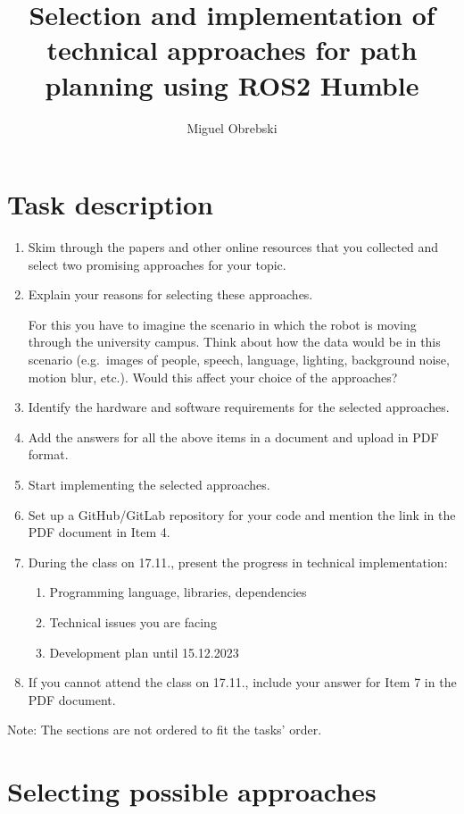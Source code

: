\documentclass[11pt,a4paper]{article}
\title{Selection and implementation of technical approaches for path planning using ROS2 Humble}
\author{Miguel Obrebski}
\date{} %
\begin{document}
\maketitle


\section{Task description}
\begin{enumerate}
    \item Skim through the papers and other online resources that you collected and select two promising approaches for your topic.
    \item Explain your reasons for selecting these approaches.

          For this you have to imagine the scenario in which the robot is moving through the university campus. Think about how the data would be in this scenario (e.g.\
          images of people, speech, language, lighting, background noise, motion blur, etc.). Would this affect your choice of the approaches?
    \item Identify the hardware and software requirements for the selected approaches.
    \item Add the answers for all the above items in a document and upload in PDF format.
    \item Start implementing the selected approaches.
    \item Set up a GitHub/GitLab repository for your code and mention the link in the PDF document in Item 4.
    \item During the class on 17.11., present the progress in technical implementation:

          \begin{enumerate}
              \item Programming language, libraries, dependencies
              \item Technical issues you are facing
              \item Development plan until 15.12.2023
          \end{enumerate}
    \item If you cannot attend the class on 17.11., include your answer for Item 7 in the PDF document.
\end{enumerate}
Note: The sections are not ordered to fit the tasks' order.


\section{Selecting possible approaches}
\end{document}
